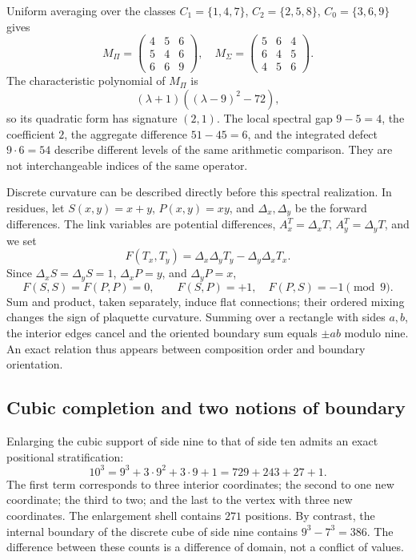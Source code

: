 Uniform averaging over the classes \(C_1=\{1,4,7\}\), \(C_2=\{2,5,8\}\), \(C_0=\{3,6,9\}\) gives
\[
 M_\Pi=\begin{pmatrix}4&5&6\\5&4&6\\6&6&9\end{pmatrix},\quad
 M_\Sigma=\begin{pmatrix}5&6&4\\6&4&5\\4&5&6\end{pmatrix}.
\]
The characteristic polynomial of \(M_\Pi\) is
\[
 (\lambda+1)((\lambda-9)^2-72),
\]
so its quadratic form has signature \((2,1)\). The local spectral gap \(9-5=4\), the coefficient \(2\), the aggregate difference \(51-45=6\), and the integrated defect \(9\cdot6=54\) describe different levels of the same arithmetic comparison. They are not interchangeable indices of the same operator.



Discrete curvature can be described directly before this spectral realization. In residues, let \(S(x,y)=x+y\), \(P(x,y)=xy\), and \(\Delta_x,\Delta_y\) be the forward differences. The link variables are potential differences, \(A_x^T=\Delta_xT\), \(A_y^T=\Delta_yT\), and we set
\[
 F(T_x,T_y)=\Delta_x\Delta_yT_y-\Delta_y\Delta_xT_x.
\]
Since \(\Delta_xS=\Delta_yS=1\), \(\Delta_xP=y\), and \(\Delta_yP=x\),
\begin{equation}
 F(S,S)=F(P,P)=0,\qquad F(S,P)=+1,\quad F(P,S)=-1\pmod9.
\end{equation}
Sum and product, taken separately, induce flat connections; their ordered mixing changes the sign of plaquette curvature. Summing over a rectangle with sides \(a,b\), the interior edges cancel and the oriented boundary sum equals \(\pm ab\) modulo nine. An exact relation thus appears between composition order and boundary orientation.

\subsection{Cubic completion and two notions of boundary}


Enlarging the cubic support of side nine to that of side ten admits an exact positional stratification:
\begin{equation}
 10^3=9^3+3\cdot9^2+3\cdot9+1=729+243+27+1.
 \label{eq:cubo}
\end{equation}
The first term corresponds to three interior coordinates; the second to one new coordinate; the third to two; and the last to the vertex with three new coordinates. The enlargement shell contains \(271\) positions. By contrast, the internal boundary of the discrete cube of side nine contains \(9^3-7^3=386\). The difference between these counts is a difference of domain, not a conflict of values.

